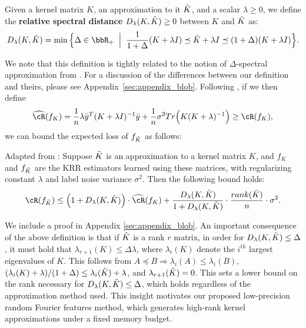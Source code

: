 \begin{definition}
	\label{def:specdist}
	Given a kernel matrix $K$, an approximation to it $\tilde{K}$, and a scalar $\lambda \geq 0$, we define the \textbf{relative spectral distance} $D_{\lambda}(K,\tilde{K})\geq 0$ between $K$ and $\tilde{K}$ as:
	$$D_{\lambda}(K,\tK) = \min \Big\{\Delta \in \RR_{+} \;\;\Big|\;\; \frac{1}{1+\Delta}(K+\lambda I) \preceq \tK + \lambda I \preceq (1+\Delta)(K+\lambda I)\Big\}.$$
\end{definition}

We note that this definition is tightly related to the notion of $\Delta$-spectral approximation from \citet{avron17}.  For a discussion of the differences between our definition and theirs, please see Appendix~\ref{sec:appendix_blob}. Following \citet{avron17}, if we then define 
$$\hcR(f_K) = \frac{1}{n}\lambda \by^T(K+\lambda I)^{-1}\by + \frac{1}{n}\sigma^2 Tr\Big(K(K+\lambda)^{-1}\Big) \geq \cR(f_K),$$ 
we can bound the expected loss of $f_{\tilde{K}}$ as follows:

\begin{proposition}{Adapted from \citep{avron17}:}
	\label{prop:avron}
	Suppose $\tilde{K}$ is an approximation to a kernel matrix $K$, and $f_{K}$ and $f_{\tilde{K}}$ are the KRR estimators learned using these matrices, with regularizing constant $\lambda$ and label noise variance $\sigma^2$. Then the following bound holds:
	\begin{eqnarray}
	\cR(f_{\tK}) \leq \Big(1+D_{\lambda}(K,\tK)\Big)\cdot \hcR(f_K) + \frac{D_{\lambda}(K,\tK)}{1+D_{\lambda}(K,\tK)}\cdot \frac{rank(\tK)}{n}\cdot\sigma^2.
	\end{eqnarray}
\end{proposition}
We include a proof in Appendix \ref{sec:appendix_blob}. An important consequence of the above definition is that if $\tilde{K}$ is a rank $r$ matrix, in order for $D_{\lambda}(K,\tilde{K}) \leq \Delta$, it must hold that $\lambda_{r+1}(K) \leq \Delta \lambda$, where $\lambda_i(K)$ denote the $i^{th}$ largest eigenvalues of $K$.  This follows from $A\preceq B \Rightarrow \lambda_i(A) \leq \lambda_i(B)$, $(\lambda_i(K) + \lambda)/(1+\Delta) \leq \lambda_i(\tilde{K}) + \lambda$, and $\lambda_{r+1}(\tilde{K}) = 0$.  This sets a lower bound on the rank necessary for $D_{\lambda}(K,\tilde{K}) \leq \Delta$, which holds regardless of the approximation method used. This insight motivates our proposed low-precision random Fourier features method, which generates high-rank kernel approximations under a fixed memory budget.